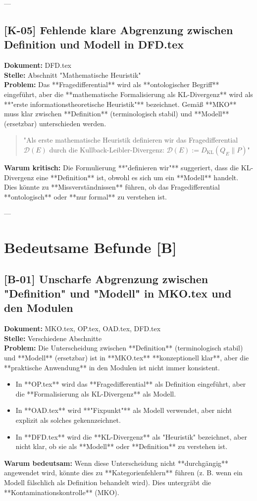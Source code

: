 \documentclass[11pt,a4paper]{article}
\begin{document}
---

\subsection*{[K-05] Fehlende klare Abgrenzung zwischen Definition und Modell in DFD.tex}
\textbf{Dokument:} DFD.tex \\
\textbf{Stelle:} Abschnitt "Mathematische Heuristik" \\
\textbf{Problem:}
Das **Fragedifferential** wird als **ontologischer Begriff** eingeführt, aber die **mathematische Formalisierung als KL-Divergenz** wird als **"erste informationstheoretische Heuristik"** bezeichnet. Gemäß **MKO** muss klar zwischen **Definition** (terminologisch stabil) und **Modell** (ersetzbar) unterschieden werden.
\begin{quote}
"Als erste mathematische Heuristik definieren wir das Fragedifferential $\mathcal{D}(E)$ durch die Kullback-Leibler-Divergenz: $\mathcal{D}(E) := D_{\mathrm{KL}}(Q_E \| P)$"
\end{quote}
\textbf{Warum kritisch:}
Die Formulierung **"definieren wir"** suggeriert, dass die KL-Divergenz eine **Definition** ist, obwohl es sich um ein **Modell** handelt. Dies könnte zu **Missverständnissen** führen, ob das Fragedifferential **ontologisch** oder **nur formal** zu verstehen ist.

---
\section*{Bedeutsame Befunde [B]}

\subsection*{[B-01] Unscharfe Abgrenzung zwischen "Definition" und "Modell" in MKO.tex und den Modulen}
\textbf{Dokument:} MKO.tex, OP.tex, OAD.tex, DFD.tex \\
\textbf{Stelle:} Verschiedene Abschnitte \\
\textbf{Problem:}
Die Unterscheidung zwischen **Definition** (terminologisch stabil) und **Modell** (ersetzbar) ist in **MKO.tex** **konzeptionell klar**, aber die **praktische Anwendung** in den Modulen ist nicht immer konsistent.
\begin{itemize}
    \item In **OP.tex** wird das **Fragedifferential** als Definition eingeführt, aber die **Formalisierung als KL-Divergenz** als Modell.
    \item In **OAD.tex** wird **"Fixpunkt"** als Modell verwendet, aber nicht explizit als solches gekennzeichnet.
    \item In **DFD.tex** wird die **KL-Divergenz** als "Heuristik" bezeichnet, aber nicht klar, ob sie als **Modell** oder **Definition** zu verstehen ist.
\end{itemize}
\textbf{Warum bedeutsam:}
Wenn diese Unterscheidung nicht **durchgängig** angewendet wird, könnte dies zu **Kategorienfehlern** führen (z. B. wenn ein Modell fälschlich als Definition behandelt wird). Dies untergräbt die **Kontaminationskontrolle** (MKO).
\end{document}

